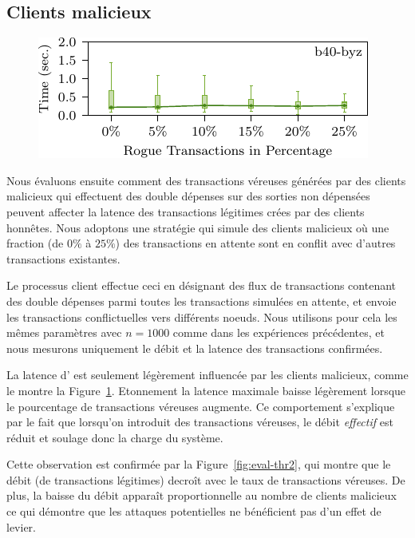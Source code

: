 \subsection{Clients malicieux}
\label{sec:evaluation-misbehaving}
\begin{figure}
\includegraphics[width=\linewidth]{figures/lat3.pdf}
\label{fig:eval-lat3}
\end{figure}

Nous évaluons ensuite comment des transactions véreuses générées par des clients malicieux qui effectuent des
double dépenses sur des sorties non dépensées peuvent affecter la latence des transactions légitimes crées par
des clients honnêtes. Nous adoptons une stratégie qui simule des clients malicieux où une fraction (de $0\%$ à $25\%$)
des transactions en attente sont en conflit avec d'autres transactions existantes.

Le processus client effectue ceci en désignant des flux de transactions contenant des double dépenses parmi toutes
les transactions simulées en attente, et envoie les transactions conflictuelles vers différents noeuds. Nous utilisons
pour cela les mêmes paramètres avec $n = 1000$ comme dans les expériences précédentes, et nous mesurons uniquement
le débit et la latence des transactions confirmées.

La latence d'{\sysname} est seulement légèrement influencée par les clients malicieux, comme le montre la
Figure~\ref{fig:eval-lat3}. Etonnement la latence maximale baisse légèrement lorsque le pourcentage de transactions
véreuses augmente. Ce comportement s'explique par le fait que lorsqu'on introduit des transactions véreuses, le débit
\emph{effectif} est réduit et soulage donc la charge du système.

Cette observation est confirmée par la Figure~\ref{fig:eval-thr2}, qui montre que le débit (de transactions légitimes)
decroît avec le taux de transactions véreuses. De plus, la baisse du débit apparaît proportionnelle au nombre de
clients malicieux ce qui démontre que les attaques potentielles ne bénéficient pas d'un effet de levier.

